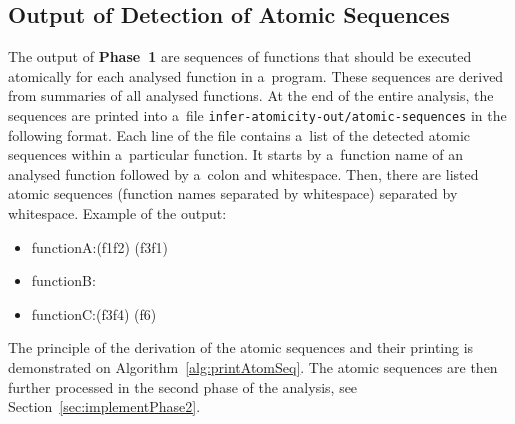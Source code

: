 \subsection{Output of Detection of Atomic Sequences}
\label{sec:implementPhase1Out}

The output of \textbf{Phase~1} are sequences of functions that should
be executed atomically for each analysed function in a~program.
These sequences are derived from summaries of all analysed functions.
At the end of the entire analysis, the sequences are printed into a~file
\texttt{infer-atomicity-out/atomic-sequences} in the following format. Each
line of the file contains a~list of the detected atomic sequences within
a~particular function. It starts by a~function name of an analysed function
followed by a~colon and whitespace. Then, there are listed atomic sequences
(function names separated by whitespace) separated by whitespace.
Example of the output:
\begin{samepage}
    \begin{itemize}[label=]
        \tt

        \item
            functionA:{\textvisiblespace}(f1{\textvisiblespace}f2)%
            {\textvisiblespace}(f3{\textvisiblespace}f1)

        \item
            functionB:{\textvisiblespace}

        \item
            functionC:{\textvisiblespace}(f3{\textvisiblespace}f4)%
            {\textvisiblespace}(f6)
    \end{itemize}
\end{samepage}
The principle of the derivation of the atomic sequences and their printing
is demonstrated on Algorithm~\ref{alg:printAtomSeq}. The atomic sequences
are then further processed in the second phase of the analysis, see
Section~\ref{sec:implementPhase2}.

\begin{algorithm}[hbt]



    \caption{%
        Printing atomic sequences from summaries of all analysed functions
    }
    \label{alg:printAtomSeq}
\end{algorithm}


